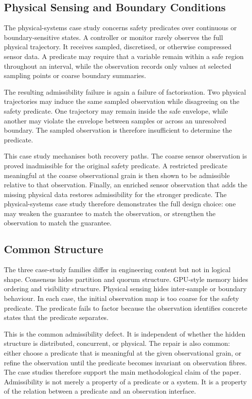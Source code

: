 \subsection{Physical Sensing and Boundary Conditions}

The physical-systems case study concerns safety predicates over continuous or
boundary-sensitive states. A controller or monitor rarely observes the full
physical trajectory. It receives sampled, discretised, or otherwise compressed
sensor data. A predicate may require that a variable remain within a safe region
throughout an interval, while the observation records only values at selected
sampling points or coarse boundary summaries.

The resulting admissibility failure is again a failure of factorisation. Two
physical trajectories may induce the same sampled observation while disagreeing
on the safety predicate. One trajectory may remain inside the safe envelope,
while another may violate the envelope between samples or across an unresolved
boundary. The sampled observation is therefore insufficient to determine the
predicate.

This case study mechanises both recovery paths. The coarse sensor observation is
proved inadmissible for the original safety predicate. A restricted predicate
meaningful at the coarse observational grain is then shown to be admissible
relative to that observation. Finally, an enriched sensor observation that adds
the missing physical data restores admissibility for the stronger predicate. The
physical-systems case study therefore demonstrates the full design choice: one
may weaken the guarantee to match the observation, or strengthen the observation
to match the guarantee.

\subsection{Common Structure}

The three case-study families differ in engineering content but not in logical
shape. Consensus hides partition and quorum structure. GPU-style memory hides
ordering and visibility structure. Physical sensing hides inter-sample or
boundary behaviour. In each case, the initial observation map is too coarse for
the safety predicate. The predicate fails to factor because the observation
identifies concrete states that the predicate separates.

This is the common admissibility defect. It is independent of whether the hidden
structure is distributed, concurrent, or physical. The repair is also common:
either choose a predicate that is meaningful at the given observational grain, or
refine the observation until the predicate becomes invariant on observation
fibres. The case studies therefore support the main methodological claim of the
paper. Admissibility is not merely a property of a predicate or a system. It is a
property of the relation between a predicate and an observation interface.
